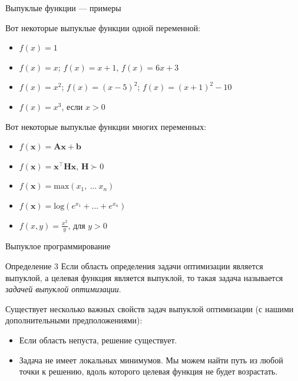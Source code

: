 \documentclass{beamer}
\begin{document}
\begin{frame}{Выпуклые функции — примеры}
	\begin{flushleft}
		
		Вот некоторые выпуклые функции одной переменной:
		
		\begin{itemize}
			\item $f(x) = 1$
			\item $f(x) = x$; $f(x) = x + 1$, $f(x) = 6x + 3$
			\item $f(x) = x^2$; $f(x) = (x - 5)^2$; $f(x) = (x + 1)^2 - 10$
			\item $f(x) = x^3$, если $x > 0$
		\end{itemize}
		
		\bigskip
		
		Вот некоторые выпуклые функции многих переменных:
		
		\begin{itemize}
			\item $f(\mathbf{x}) = \mathbf{A}\mathbf{x} + \mathbf{b}$
			\item $f(\mathbf{x}) = \mathbf{x}^\top \mathbf{H}\mathbf{x}$, $\mathbf{H} \succ 0$
			\item $f(\mathbf{x}) = \text{max}(x_1, \ ... \ x_n) $
			\item $f(\mathbf{x}) = \text{log}(e^{x_1}+ ... +e^{x_n}) $
			\item $f(x, y) = \frac{x^2}{y}$, для $y > 0$
		\end{itemize}
		
	\end{flushleft}
\end{frame}

\begin{frame}{Выпуклое программирование}
	\begin{flushleft}
		
		\begin{block}{Определение 3}
			Если область определения задачи оптимизации является выпуклой, а целевая функция является выпуклой, то такая задача называется \emph{задачей выпуклой оптимизации}.
		\end{block}
		
		\bigskip
		
		Существует несколько важных свойств задач выпуклой оптимизации (с нашими дополнительными предположениями):
		
		\begin{itemize}
			\item Если область непуста, решение существует.
			\item Задача не имеет локальных минимумов. Мы можем найти путь из любой точки к решению, вдоль которого целевая функция не будет возрастать.
		\end{itemize}
		
	\end{flushleft}
\end{frame}
\end{document}
